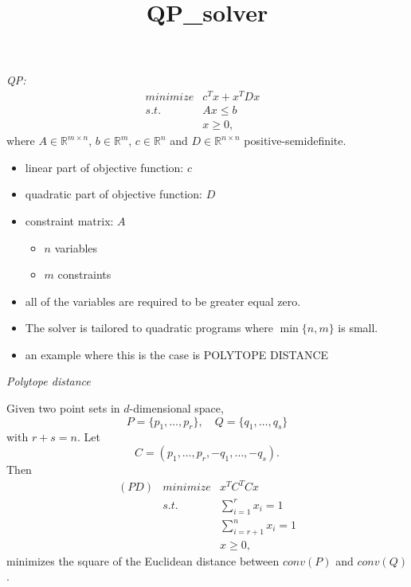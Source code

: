 \documentclass{slides}
\title{QP\_solver}
\author{}
\newcommand{\R}{\ensuremath{\mathbb{R}}}
\begin{document}
\maketitle
\begin{slide}
\emph{QP:}
\begin{eqnarray*}
minimize & c^{T}x+x^{T}Dx & \\
s.t.     & Ax \leq b & \\
         & x \geq 0 ,&
\end{eqnarray*}
where
$A \in \R^{m \times n}$, $b \in \R^{m}$, $c \in \R^{n}$ and $D \in \R^{n
\times n}$ positive-semidefinite.


\end{slide}

\begin{note}
\begin{itemize}
\item linear part of objective function: $c$
\item quadratic part of objective function: $D$
\item constraint matrix: $A$
\begin{itemize}
\item $n$ variables
\item $m$ constraints
\end{itemize}
\item all of the variables are required to be greater equal zero.
\item The solver is tailored to quadratic programs where
$\min\{n,m\}$ is small.
\item an example where this is the case is POLYTOPE DISTANCE
\end{itemize}
\end{note}

\begin{slide}
\emph{Polytope distance}

Given two point sets in $d$-dimensional space,
\[
P=\{p_{1}, \ldots, p_{r} \},
\quad
Q=\{q_{1}, \ldots, q_{s} \}
\]
with $r+s=n$. Let
\[
C=(p_{1}, \ldots , p_{r}, -q_{1}, \ldots, -q_{s}).
\]
Then 
\begin{eqnarray*}
(PD) & minimize & x^{T}C^{T}Cx  \\
     & s.t.     & \sum_{i=1}^{r}x_{i} = 1 \\
     &          & \sum_{i=r+1}^{n}x_{i} = 1 \\
     &          & x \geq 0,
\end{eqnarray*}
minimizes the square of the Euclidean distance between $conv(P)$ and $conv(Q)$.
\end{slide}
\end{document}
